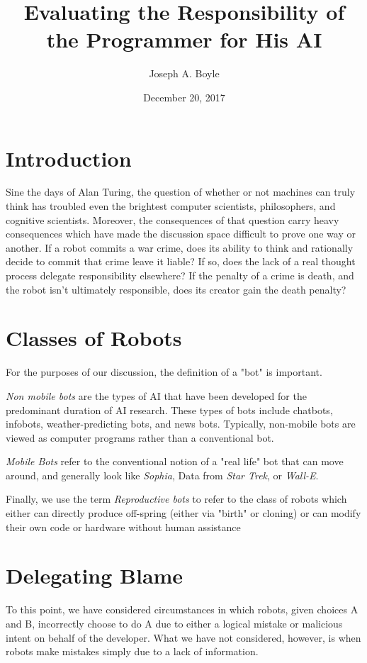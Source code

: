 \documentclass[12]{article}
\title{Evaluating the Responsibility of the Programmer for His AI}
\author{Joseph A. Boyle}
\date{December 20, 2017}
\begin{document}
\maketitle

\section{Introduction}
Sine the days of Alan Turing\cite{turing_test}, the question of whether or not machines can truly think has troubled even the brightest computer scientists, philosophers, and cognitive scientists. Moreover, the consequences of that question carry heavy consequences which have made the discussion space difficult to prove one way or another. If a robot commits a war crime, does its ability to think and rationally decide to commit that crime leave it liable? If so, does the lack of a real thought process delegate responsibility elsewhere? If the penalty of a crime is death, and the robot isn't ultimately responsible, does its creator gain the death penalty?

\section{Classes of Robots}
	For the purposes of our discussion, the definition of a "bot" is important. 

	\textit{Non mobile bots} are the types of AI that have been developed for the predominant duration of AI research. These types of bots include chatbots, infobots, weather-predicting bots, and news bots. Typically, non-mobile bots are viewed as computer programs rather than a conventional bot. 
	
	\textit{Mobile Bots} refer to the conventional notion of a "real life" bot that can move around, and generally look like \textit{Sophia}, Data from \textit{Star Trek}, or \textit{Wall-E}. 
	
	Finally, we use the term \textit{Reproductive bots} to refer to the class of robots which either can directly produce off-spring (either via "birth" or cloning) or can modify their own code or hardware without human assistance

\section{Delegating Blame}
	
	To this point, we have considered circumstances in which robots, given choices A and B, incorrectly choose to do A due to either a logical mistake or malicious intent on behalf of the developer. What we have not considered, however, is when robots make mistakes simply due to a lack of information.			
		
\end{document}
